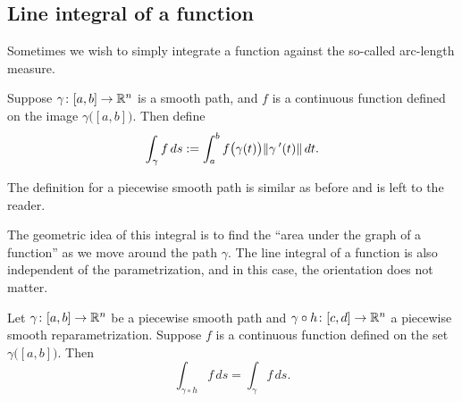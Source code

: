 

\subsection{Line integral of a function}

Sometimes we wish to simply integrate a function against the so-called
arc-length measure.

\begin{defn}
Suppose $\gamma \colon [a,b] \to {\mathbb{R}}^n$ is a smooth path, and $f$ is a
continuous function defined on the image $\gamma\bigl([a,b]\bigr)$.  Then
define
\begin{equation*}
\int_{\gamma} f \,ds :=
\int_a^b f\bigl( \gamma(t) \bigr) \lVert {\gamma^{\:\prime}(t)} \rVert \, dt .
\end{equation*}

The definition for a piecewise smooth path is similar as before and is left
to the reader.
\end{defn}

The geometric idea of this integral is to find the ``area under the
graph of a function'' as we move around the path $\gamma$.
The line integral of a function is also independent of the parametrization,
and in this case, the orientation does not matter.

\begin{prop} \label{mv:prop:lineintrepararam}
Let $\gamma \colon [a,b] \to {\mathbb{R}}^n$ be a piecewise smooth path and
$\gamma \circ h \colon [c,d] \to {\mathbb{R}}^n$ a piecewise smooth reparametrization.
Suppose $f$ is a continuous function defined on the set
$\gamma\bigl([a,b]\bigr)$.  Then
\begin{equation*}
\int_{\gamma \circ h} f\, ds = \int_{\gamma} f\, ds .
\end{equation*}
\end{prop}


